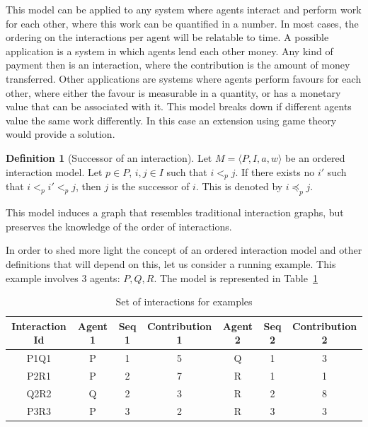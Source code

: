 \documentclass[a4paper,11pt]{book}
\theoremstyle{definition}
\newtheorem{definition}{Definition}
\begin{document}
This model can be applied to any system where
agents interact and perform work for each other, where this work can be quantified in a number.
In most cases, the ordering on the interactions per agent will be relatable
to time. A possible application is a system in which agents lend each other money. Any
kind of payment then is an interaction, where the contribution is the amount of money transferred.
Other applications are systems where agents perform favours for each other, where either the favour
is measurable in a quantity, or has a monetary value that can be associated with it.
This model breaks down if different agents value the same work differently. In this case
an extension using game theory would provide a solution.

\begin{definition}[Successor of an interaction]
    Let $M=\langle P, I, a, w \rangle$ be an ordered interaction model.
    Let $p \in P$, $i, j \in I$ such that $i <_p j$. If there exists no $i'$ such that $i <_p i' <_p j$, then
    $j$ is the successor of $i$. This is denoted by $i \preceq_p j$.
\end{definition}
 
This model induces a graph that resembles traditional interaction graphs, but preserves the knowledge
of the order of interactions.


In order to shed more light the concept of an ordered interaction model and other
definitions that will depend on this, let us consider a running example. This example involves
3 agents: $P, Q, R$. The model is represented in Table~\ref{tab:interactions}

\begin{table}[h]
    \centering
    \begin{tabular}{c|c|c|c|c|c|c}
        Interaction Id & Agent 1 & Seq 1 & Contribution 1 & Agent 2 & Seq 2 & Contribution 2 \\\hline
        P1Q1           & P       & 1                 & 5            & Q       & 1                 & 3            \\
        P2R1           & P       & 2                 & 7            & R       & 1                 & 1            \\
        Q2R2           & Q       & 2                 & 3            & R       & 2                 & 8            \\
        P3R3           & P       & 3                 & 2            & R       & 3                 & 3            \\
    \end{tabular}
    \caption{Set of interactions for examples}
    \label{tab:interactions}
\end{table}
\end{document}
